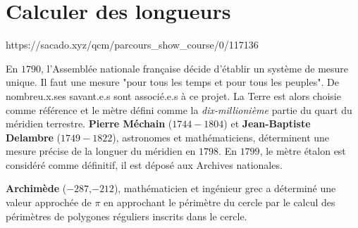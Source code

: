 \chapter{Calculer des longueurs}
{https://sacado.xyz/qcm/parcours_show_course/0/117136}
{

\begin{His}
En $1790$, l'Assemblée nationale française décide d'établir un système de mesure unique. Il faut une mesure "pour tous les temps et pour tous les peuples". De nombreu.x.ses savant.e.s sont associé.e.s à ce projet. La Terre est alors choisie comme référence et le mètre défini comme la \textit{dix-millionième} partie du quart du méridien terrestre. \textbf{{\color{violet}Pierre Méchain}} ($1744-1804$) et \textbf{{\color{violet}Jean-Baptiste Delambre}} ($1749-1822$), astronomes et mathématiciens, déterminent une mesure précise de la longuer du méridien en $1798$. En $1799$, le mètre étalon est considéré comme définitif, il est déposé aux Archives nationales.

\vspace{0.3cm}
\textbf{{\color{violet}Archimède}} ($-287$,$-212$), mathématicien et ingénieur grec a déterminé une valeur approchée de $\pi$ en approchant le périmètre du cercle par le calcul des périmètres de polygones réguliers inscrits dans le cercle.


\end{His}}
